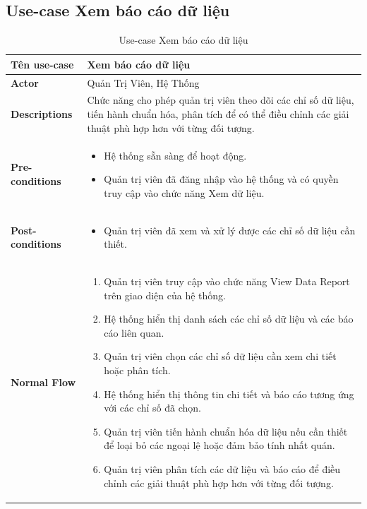 \subsection{Use-case Xem báo cáo dữ liệu}
    \begin{longtable}[H]{|l|p{}|}
        \caption{Use-case Xem báo cáo dữ liệu}
        \\ \hline
        \textbf{Tên use-case} & Xem báo cáo dữ liệu\\
        \hline
        \textbf{Actor} & Quản Trị Viên, Hệ Thống \\
        \hline
        \textbf{Descriptions} & Chức năng cho phép quản trị viên theo dõi các chỉ số dữ liệu, tiến hành chuẩn hóa, phân tích để có thể điều chỉnh các giải thuật phù hợp hơn với từng đối tượng. \\
        \hline
        \textbf{Pre-conditions} & \vspace{-1cm} \begin{itemize}[leftmargin=4mm]
            \setlength\itemsep{0em}
            \item Hệ thống sẵn sàng để hoạt động.
            \item Quản trị viên đã đăng nhập vào hệ thống và có quyền truy cập vào chức năng Xem dữ liệu.
        \end{itemize} \\
        
        \hline

        \textbf{Post-conditions} & \vspace{-1cm} \begin{itemize}[leftmargin=4mm]
            \setlength\itemsep{0em}
            \item Quản trị viên đã xem và xử lý được các chỉ số dữ liệu cần thiết. 
        \end{itemize} \\
            
        \hline
        \textbf{Normal Flow} & \vspace{-1cm}
            \begin{enumerate}[leftmargin=5.5mm]
                \setlength\itemsep{0em}
                \item Quản trị viên truy cập vào chức năng View Data Report trên giao diện của hệ thống.
                \item Hệ thống hiển thị danh sách các chỉ số dữ liệu và các báo cáo liên quan.
                \item Quản trị viên chọn các chỉ số dữ liệu cần xem chi tiết hoặc phân tích.
                \item Hệ thống hiển thị thông tin chi tiết và báo cáo tương ứng với các chỉ số đã chọn. 
                \item Quản trị viên tiến hành chuẩn hóa dữ liệu nếu cần thiết để loại bỏ các ngoại lệ hoặc đảm bảo tính nhất quán.
                \item Quản trị viên phân tích các dữ liệu và báo cáo để điều chỉnh các giải thuật phù hợp hơn với từng đối tượng.
            \end{enumerate}\\
            

\end{longtable}
